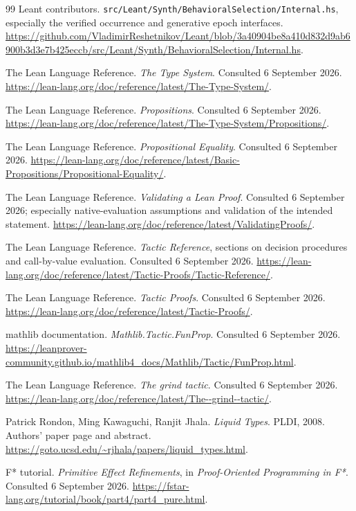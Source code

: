 \documentclass[11pt,letterpaper]{article}
\newcommand{\code}[1]{\nolinkurl{#1}}
\theoremstyle{definition}
\theoremstyle{remark}
\begin{document}
\begin{thebibliography}{99}
 Leant contributors.
\code{src/Leant/Synth/BehavioralSelection/Internal.hs}, especially the verified
occurrence and generative epoch interfaces.
\url{https://github.com/VladimirReshetnikov/Leant/blob/3a40904be8a410d832d9ab6900b3d3e7b425eccb/src/Leant/Synth/BehavioralSelection/Internal.hs}.

 The Lean Language Reference. \emph{The Type System}.
Consulted 6 September 2026.
\url{https://lean-lang.org/doc/reference/latest/The-Type-System/}.

 The Lean Language Reference. \emph{Propositions}.
Consulted 6 September 2026.
\url{https://lean-lang.org/doc/reference/latest/The-Type-System/Propositions/}.

 The Lean Language Reference. \emph{Propositional Equality}.
Consulted 6 September 2026.
\url{https://lean-lang.org/doc/reference/latest/Basic-Propositions/Propositional-Equality/}.

 The Lean Language Reference. \emph{Validating a Lean Proof}.
Consulted 6 September 2026; especially native-evaluation assumptions and
validation of the intended statement.
\url{https://lean-lang.org/doc/reference/latest/ValidatingProofs/}.

 The Lean Language Reference. \emph{Tactic Reference},
sections on decision procedures and call-by-value evaluation.
Consulted 6 September 2026.
\url{https://lean-lang.org/doc/reference/latest/Tactic-Proofs/Tactic-Reference/}.

 The Lean Language Reference. \emph{Tactic Proofs}.
Consulted 6 September 2026.
\url{https://lean-lang.org/doc/reference/latest/Tactic-Proofs/}.

 mathlib documentation.
\emph{Mathlib.Tactic.FunProp}. Consulted 6 September 2026.
\url{https://leanprover-community.github.io/mathlib4_docs/Mathlib/Tactic/FunProp.html}.

 The Lean Language Reference. \emph{The grind tactic}.
Consulted 6 September 2026.
\url{https://lean-lang.org/doc/reference/latest/The--grind--tactic/}.

 Patrick Rondon, Ming Kawaguchi, Ranjit Jhala.
\emph{Liquid Types}. PLDI, 2008. Authors' paper page and abstract.
\url{https://goto.ucsd.edu/~rjhala/papers/liquid_types.html}.

 F* tutorial.
\emph{Primitive Effect Refinements}, in \emph{Proof-Oriented Programming in F*}.
Consulted 6 September 2026.
\url{https://fstar-lang.org/tutorial/book/part4/part4_pure.html}.
\end{thebibliography}
\end{document}
